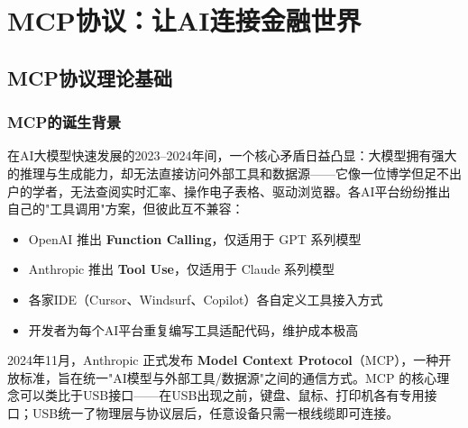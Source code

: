
\chapter{MCP协议：让AI连接金融世界}

\section{MCP协议理论基础}

\subsection{MCP的诞生背景}

在AI大模型快速发展的2023--2024年间，一个核心矛盾日益凸显：大模型拥有强大的推理与生成能力，却无法直接访问外部工具和数据源——它像一位博学但足不出户的学者，无法查阅实时汇率、操作电子表格、驱动浏览器。各AI平台纷纷推出自己的"工具调用"方案，但彼此互不兼容：

\begin{itemize}[leftmargin=2em]
  \item OpenAI 推出 \textbf{Function Calling}，仅适用于 GPT 系列模型
  \item Anthropic 推出 \textbf{Tool Use}，仅适用于 Claude 系列模型
  \item 各家IDE（Cursor、Windsurf、Copilot）各自定义工具接入方式
  \item 开发者为每个AI平台重复编写工具适配代码，维护成本极高
\end{itemize}

2024年11月，Anthropic 正式发布 \textbf{Model Context Protocol}（MCP），一种开放标准，旨在统一"AI模型与外部工具/数据源"之间的通信方式。MCP 的核心理念可以类比于USB接口——在USB出现之前，键盘、鼠标、打印机各有专用接口；USB统一了物理层与协议层后，任意设备只需一根线缆即可连接。


